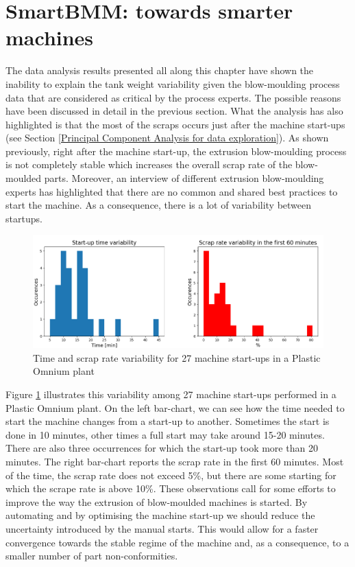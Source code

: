 \section{SmartBMM: towards smarter machines}

The data analysis results presented all along this chapter have shown the inability to explain the tank weight variability given the blow-moulding process data that are considered as critical by the process experts. The possible reasons have been discussed in detail in the previous section. What the analysis has also highlighted is that the most of the scraps occurs just after the machine start-ups (see Section \ref{Principal Component Analysis for data exploration}). As shown previously, right after the machine start-up, the extrusion blow-moulding process is not completely stable which increases the overall scrap rate of the blow-moulded parts. Moreover, an interview of different extrusion blow-moulding experts has highlighted that there are no common and shared best practices to start the machine. As a consequence,  there is a lot of variability between startups.

\begin{figure}
\centerline{\includegraphics[scale=0.7]{images/chapter_3/smartbmm_barchart.png}}
\caption{Time and scrap rate variability for 27 machine start-ups in a Plastic Omnium plant}
\label{fig:smartbmm_barchart}
\end{figure}
%
Figure \ref{fig:smartbmm_barchart} illustrates this variability among 27 machine start-ups performed in a Plastic Omnium plant. On the left bar-chart, we can see how the time needed to start the machine changes from a start-up to another. Sometimes the start is done in 10 minutes, other times a full start may take around 15-20 minutes. There are also three occurrences for which the start-up took more than 20 minutes. The right bar-chart reports the scrap rate in the first 60 minutes. Most of the time, the scrap rate does not exceed 5\%, but there are some starting for which the scrape rate is above 10\%. These observations call for some efforts to improve the way the extrusion of blow-moulded machines is started. By automating and by optimising the machine start-up we should reduce the uncertainty introduced by the manual starts. This would allow for a faster convergence towards the stable regime of the machine and, as a consequence, to a smaller number of part non-conformities.   

